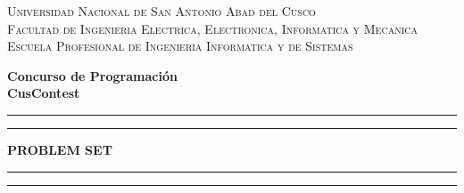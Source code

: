 \documentclass[12pt,oneside,a4paper]{book}
\theoremstyle{definition}
\begin{document}
\vspace*{1in}
\begin{center}
\textsc{\large Universidad Nacional de San Antonio Abad del Cusco}\\\vspace*{0.04in}
\textsc{Facultad de Ingenieria Electrica, Electronica, Informatica y Mecanica}\\
\vspace*{0.04in}
\textsc{Escuela Profesional de Ingenieria Informatica y de Sistemas}\\
\captionsetup[figure]{labelformat=empty}

\vspace*{2in}
\newcommand{\topline}{
\rule{164.7mm}{2mm}
\vspace*{-0.18in}
\hrule
}
\newcommand{\downline}{
\hrule
\vspace*{0.02in}
\rule{164.7mm}{2mm}
}
\vspace*{-0.6in}
\textbf{Concurso de Programación}\\
\textbf{\CusContestEditionGreekNumber CusContest}\\
\vspace*{0.8in} \topline
\vspace*{0.1in}
\begin{large}
\textbf{PROBLEM SET} \\
\end{large}
\vspace*{0.08in}
\downline
\vspace*{0.55in}


\end{center}
\end{document}
